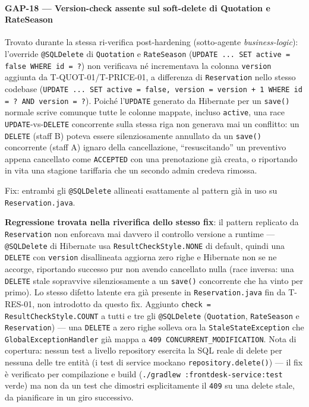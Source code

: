 ﻿\documentclass[a4paper,12pt]{report}
\begin{document}
\paragraph{GAP-18 --- Version-check assente sul soft-delete di Quotation e RateSeason}
Trovato durante la stessa ri-verifica post-hardening (sotto-agente
\emph{business-logic}): l'override \texttt{@SQLDelete} di \texttt{Quotation}
e \texttt{RateSeason} (\texttt{UPDATE ... SET active = false WHERE id = ?})
non verificava né incrementava la colonna \texttt{version} aggiunta da
T-QUOT-01/T-PRICE-01, a differenza di \texttt{Reservation} nello stesso
codebase (\texttt{UPDATE ... SET active = false, version = version + 1
WHERE id = ? AND version = ?}). Poiché l'\texttt{UPDATE} generato da
Hibernate per un \texttt{save()} normale scrive comunque tutte le colonne
mappate, incluso \texttt{active}, una race \texttt{UPDATE}-vs-\texttt{DELETE}
concorrente sulla stessa riga non generava mai un conflitto: un
\texttt{DELETE} (staff B) poteva essere silenziosamente annullato da un
\texttt{save()} concorrente (staff A) ignaro della cancellazione,
``resuscitando'' un preventivo appena cancellato come \texttt{ACCEPTED}
con una prenotazione già creata, o riportando in vita una stagione
tariffaria che un secondo admin credeva rimossa.

Fix: entrambi gli \texttt{@SQLDelete} allineati esattamente al pattern già
in uso su \texttt{Reservation.java}.

\textbf{Regressione trovata nella riverifica dello stesso fix}: il
pattern replicato da \texttt{Reservation} non enforcava mai davvero il
controllo versione a runtime --- \texttt{@SQLDelete} di Hibernate usa
\texttt{ResultCheckStyle.NONE} di default, quindi una \texttt{DELETE} con
\texttt{version} disallineata aggiorna zero righe e Hibernate non se ne
accorge, riportando successo pur non avendo cancellato nulla (race
inversa: una \texttt{DELETE} stale sopravvive silenziosamente a un
\texttt{save()} concorrente che ha vinto per primo). Lo stesso difetto
latente era già presente in \texttt{Reservation.java} fin da T-RES-01, non
introdotto da questo fix. Aggiunto \texttt{check = ResultCheckStyle.COUNT}
a tutti e tre gli \texttt{@SQLDelete} (\texttt{Quotation}, \texttt{RateSeason}
e \texttt{Reservation}) --- una \texttt{DELETE} a zero righe solleva ora la
\texttt{StaleStateException} che \texttt{GlobalExceptionHandler} già mappa
a \texttt{409 CONCURRENT\_MODIFICATION}. Nota di copertura: nessun test a
livello repository esercita la SQL reale di delete per nessuna delle tre
entità (i test di service mockano \texttt{repository.delete()}) --- il fix
è verificato per compilazione e build (\texttt{./gradlew
:frontdesk-service:test} verde) ma non da un test che dimostri
esplicitamente il \texttt{409} su una delete stale, da pianificare in un
giro successivo.
\end{document}
